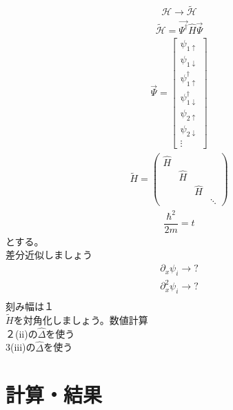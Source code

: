 \documentclass{jarticle}
\begin{document}
\begin{align}
\mathcal{H}\rightarrow \tilde{\mathcal{H}}
\end{align}
\begin{align}
\tilde{\mathcal{H}}=\vec{\Psi^{\dagger}}\hat{H}\vec{\Psi}	
\end{align}
\begin{align}
\vec{\Psi}=\begin{bmatrix}
\psi_{1\uparrow} \\
\psi_{1\downarrow} \\
\psi_{1\uparrow}^\dagger \\
\psi_{1\downarrow}^\dagger\\
\psi_{2\uparrow} \\
\psi_{2\downarrow} \\
\vdots
\end{bmatrix}
\end{align}
\begin{align}
\tilde{H}=
\begin{pmatrix}
\hat{H} &  &  &  \\
& \hat{H} &  &  \\
&  & \hat{H} &  \\
&  &  & \ddots
\end{pmatrix}
\end{align}
\begin{align}
\dfrac{\hbar^2}{2m}=t
\end{align}
とする。\\
差分近似しましょう\\
\begin{align}
\partial_x \psi_i\rightarrow?\\
\partial^2_x \psi_i\rightarrow?\\
\end{align}
刻み幅は$１$\\
$\tilde{H}$を対角化しましょう。数値計算\\
２(ii)の$\hat{\Delta}$を使う\\
3(iii)の$\hat{\Delta}$を使う\\

\section{計算・結果}
\end{document}
